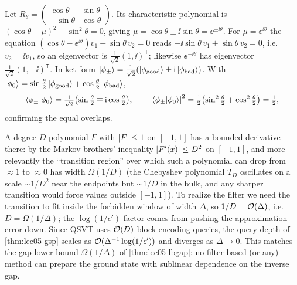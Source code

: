\begin{solution}
Let $R_\theta=\left(\begin{smallmatrix}\cos\theta&\sin\theta\\-\sin\theta&
\cos\theta\end{smallmatrix}\right)$. Its characteristic polynomial is
$(\cos\theta-\mu)^2+\sin^2\theta=0$, giving
$\mu=\cos\theta\pm\ii\sin\theta=\ee^{\pm\ii\theta}$. For $\mu=\ee^{\ii\theta}$ the
equation $(\cos\theta-\ee^{\ii\theta})v_1+\sin\theta\,v_2=0$ reads
$-\ii\sin\theta\,v_1+\sin\theta\,v_2=0$, i.e.\ $v_2=\ii v_1$, so an eigenvector is
$\tfrac{1}{\sqrt2}(1,\ii)^{\mathsf T}$; likewise $\ee^{-\ii\theta}$ has eigenvector
$\tfrac{1}{\sqrt2}(1,-\ii)^{\mathsf T}$. In ket form
$\ket{\phi_\pm}=\tfrac1{\sqrt2}(\ket{\phi_{\mathrm{good}}}\pm\mathrm{i}
\ket{\phi_{\mathrm{bad}}})$. With
$\ket{\phi_0}=\sin\tfrac{\theta}{2}\ket{\phi_{\mathrm{good}}}
+\cos\tfrac{\theta}{2}\ket{\phi_{\mathrm{bad}}}$,
\[
  \braket{\phi_\pm|\phi_0}
   =\tfrac{1}{\sqrt2}\bigl(\sin\tfrac{\theta}{2}\mp\mathrm{i}\cos\tfrac{\theta}{2}\bigr),
  \qquad
  \left\lvert \braket{\phi_\pm|\phi_0} \right\rvert^2
   =\tfrac12\bigl(\sin^2\tfrac{\theta}{2}+\cos^2\tfrac{\theta}{2}\bigr)=\tfrac12,
\]
confirming the equal overlaps.
\end{solution}

\begin{solution}
A degree-$D$ polynomial $F$ with $\left\lvert F \right\rvert\le1$ on $[-1,1]$ has a bounded
derivative there: by the Markov brothers' inequality $\left\lvert F'(x) \right\rvert\le D^2$ on
$[-1,1]$, and more relevantly the ``transition region'' over which such a
polynomial can drop from $\approx1$ to $\approx0$ has width $\Omega(1/D)$ (the
Chebyshev polynomial $T_D$ oscillates on a scale $\sim1/D^2$ near the endpoints but
$\sim1/D$ in the bulk, and any sharper transition would force values outside
$[-1,1]$). To realize the filter we need the transition to fit inside the forbidden
window of width $\Delta$, so $1/D=\mathcal{O}(\Delta)$, i.e.\ $D=\Omega(1/\Delta)$; the
$\log(1/\epsilon')$ factor comes from pushing the approximation error down. Since
QSVT uses $\mathcal{O}(D)$ block-encoding queries, the query depth of
\cref{thm:lec05-gsp} scales as $\mathcal{O}(\Delta^{-1}\log(1/\epsilon'))$ and diverges
as $\Delta\to0$. This matches the gap lower bound $\Omega(1/\Delta)$ of
\cref{thm:lec05-lbgap}: no filter-based (or any) method can prepare the ground
state with sublinear dependence on the inverse gap.
\end{solution}

